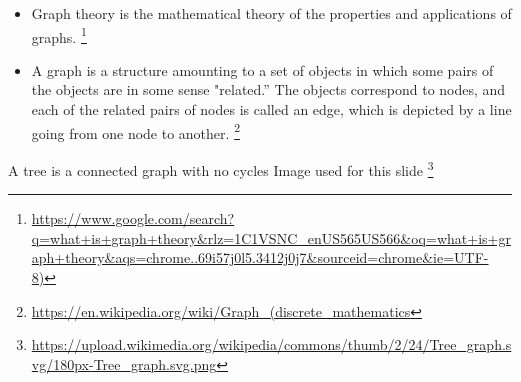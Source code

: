 \documentclass{amsart}
\theoremstyle{definition}
\theoremstyle{remark}
\numberwithin{equation}{section}
\begin{document}
\begin{itemize}
\item Graph theory is the mathematical theory of the properties and applications of graphs.%
\footnote{\url{https://www.google.com/search?q=what+is+graph+theory&rlz=1C1VSNC_enUS565US566&oq=what+is+graph+theory&aqs=chrome..69i57j0l5.3412j0j7&sourceid=chrome&ie=UTF-8)}}%
\item A graph is a structure amounting to a set of objects in which some pairs of the objects are in some sense "related.” The objects correspond to nodes, and each of the related pairs of nodes is called an edge, which is depicted by a line going from one node to another.%
\footnote{\url{https://en.wikipedia.org/wiki/Graph_(discrete_mathematics}}%
\end{itemize}

A tree is a connected graph with no cycles
\newline
Image used for this slide%
\footnote{\url{https://upload.wikimedia.org/wikipedia/commons/thumb/2/24/Tree_graph.svg/180px-Tree_graph.svg.png}}%
\end{document}
